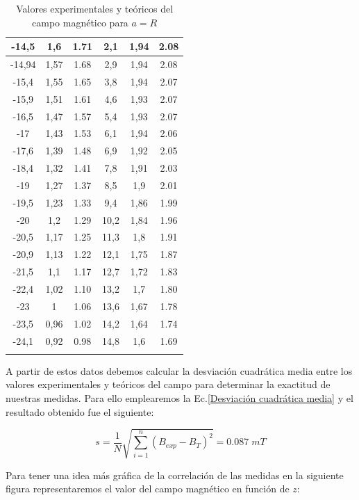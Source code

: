 \documentclass[a4paper,12pt,titlepage]{article}
\begin{document}
\begin{longtable}[t]{|c|c|c|c|c|c|}
    -14,5  & 1,6  & 1.71 & 2,1   & 1,94 & 2.08 \\ \hline
    -14,94 & 1,57 & 1.68 & 2,9   & 1,94 & 2.08 \\ \hline
    -15,4  & 1,55 & 1.65 & 3,8   & 1,94 & 2.07 \\ \hline
    -15,9  & 1,51 & 1.61 & 4,6   & 1,93 & 2.07 \\ \hline
    -16,5  & 1,47 & 1.57 & 5,4   & 1,93 & 2.07 \\ \hline
    -17    & 1,43 & 1.53 & 6,1   & 1,94 & 2.06 \\ \hline
    -17,6  & 1,39 & 1.48 & 6,9   & 1,92 & 2.05 \\ \hline
    -18,4  & 1,32 & 1.41 & 7,8   & 1,91 & 2.03 \\ \hline
    -19    & 1,27 & 1.37 & 8,5   & 1,9  & 2.01 \\ \hline
    -19,5  & 1,23 & 1.33 & 9,4   & 1,86 & 1.99 \\ \hline
    -20    & 1,2  & 1.29 & 10,2  & 1,84 & 1.96 \\ \hline
    -20,5  & 1,17 & 1.25 & 11,3  & 1,8  & 1.91 \\ \hline
    -20,9  & 1,13 & 1.22 & 12,1  & 1,75 & 1.87 \\ \hline
    -21,5  & 1,1  & 1.17 & 12,7  & 1,72 & 1.83 \\ \hline
    -22,4  & 1,02 & 1.10 & 13,2  & 1,7  & 1.80 \\ \hline
    -23    & 1    & 1.06 & 13,6  & 1,67 & 1.78 \\ \hline
    -23,5  & 0,96 & 1.02 & 14,2  & 1,64 & 1.74 \\ \hline
    -24,1  & 0,92 & 0.98 & 14,8  & 1,6  & 1.69 \\ \hline
    \caption{Valores experimentales y teóricos del campo magnético para $a=R$}
    \label{Datos aR}
\end{longtable}


A partir de estos datos debemos calcular la desviación cuadrática media entre los valores experimentales y teóricos del campo para determinar la exactitud de nuestras medidas. Para ello emplearemos la Ec.\ref{Desviación cuadrática media} y el resultado obtenido fue el siguiente:

\begin{equation}
    s = \frac{1}{N} \sqrt{\sum_{i=1}^{n} (B_{exp} - B_T)^2} = 0.087 \; mT
\end{equation}

Para tener una idea más gráfica de la correlación de las medidas en la siguiente figura representaremos el valor del campo magnético en función de $z$:
\end{document}
